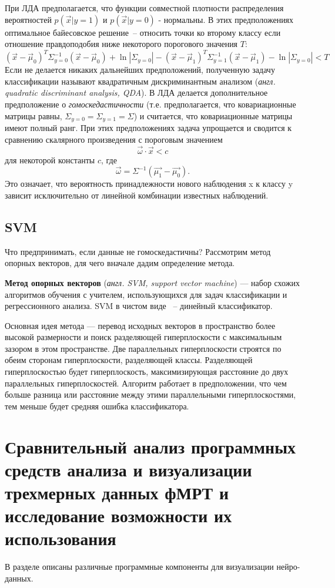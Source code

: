 При ЛДА предполагается, что функции совместной плотности распределения вероятностей $p(\vec{x}|y=1)$ и $p(\vec{x}|y=0)$ - нормальны. В этих предположениях оптимальное байесовское решение~-- относить точки ко второму классу если отношение правдоподобия ниже некоторого порогового значения $T$: 
$$(\vec{x}-\vec{\mu}_0)^T\Sigma_{y=0}^{-1}(\vec{x}-\vec{\mu}_0)+\ln{|\Sigma _{y=0}|}-(\vec{x}-\vec{\mu}_1)^T\Sigma _{y=1}^{-1}(\vec{x}-\vec{\mu}_1)-\ln{|\Sigma_{y=0}|}<T$$
Если не делается никаких дальнейших предположений, полученную задачу классификации называют квадратичным дискриминантным анализом (\textit{англ. quadratic discriminant analysis, QDA}). В ЛДА делается дополнительное предположение о \textit{гомоскедастичности} (т.е. предполагается, что ковариационные матрицы равны, $\Sigma_{y=0}=\Sigma_{y=1}=\Sigma$) и считается, что ковариационные матрицы имеют полный ранг. При этих предположениях задача упрощается и сводится к сравнению скалярного произведения с пороговым значением 
$$\vec{\omega}\cdot\vec{x}<c $$
\noindent
для некоторой константы $c$, где 
$$\vec{\omega}=\Sigma^{-1}(\vec{\mu_1}-\vec{\mu_0}). $$
\noindent
Это означает, что вероятность принадлежности нового наблюдения x к классу y зависит исключительно от линейной комбинации известных наблюдений.


\subsection{SVM}
Что предпринимать, если данные не гомоскедастичны?
Рассмотрим метод опорных векторов, для чего вначале дадим определение метода.

\textbf{Метод опорных векторов} (\emph {англ. SVM, support vector machine}) — набор схожих алгоритмов обучения с учителем, использующихся для задач классификации и регрессионного анализа. SVM в чистом виде ~-- динейный классификатор.

Основная идея метода — перевод исходных векторов в пространство более высокой размерности и поиск разделяющей гиперплоскости с максимальным зазором в этом пространстве. Две параллельных гиперплоскости строятся по обеим сторонам гиперплоскости, разделяющей классы. Разделяющей гиперплоскостью будет гиперплоскость, максимизирующая расстояние до двух параллельных гиперплоскостей. Алгоритм работает в предположении, что чем больше разница или расстояние между этими параллельными гиперплоскостями, тем меньше будет средняя ошибка классификатора.



\section{Сравнительный анализ программных средств анализа и визуализации трехмерных данных фМРТ и исследование возможности их использования}
\begin{annotation}
	В разделе описаны  различные программные компоненты для визуализации нейро-данных.
\end{annotation}

